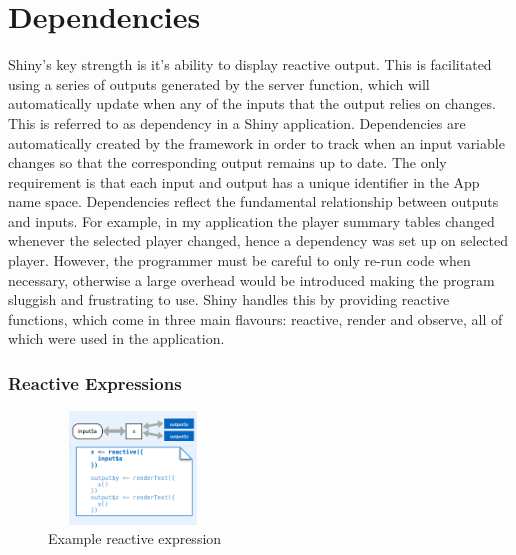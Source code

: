 \section{Dependencies}
Shiny's key strength is it's ability to display reactive output. This is facilitated using a series of outputs generated by the server function, which will automatically update when any of the inputs that the output relies on changes. This is referred to as dependency in a Shiny application. Dependencies are automatically created by the framework in order to track when an input variable changes so that the corresponding output remains up to date. The only requirement is that each input and output has a unique identifier in the App name space. Dependencies reflect the fundamental relationship between outputs and inputs. For example, in my application the player summary tables changed whenever the selected player changed, hence a dependency was set up on selected player. However, the programmer must be careful to only re-run code when necessary, otherwise a large overhead would be introduced making the program sluggish and frustrating to use. Shiny handles this by providing reactive functions, which come in three main flavours: reactive, render and observe, all of which were used in the application. 
\subsubsection{Reactive Expressions}
\begin{figure}
	\vspace{-2.5em}
	\caption{Example reactive expression \cite{shinyCheatSheet}\label{wrap-fig:1}}
	\includegraphics[height=3cm, width=4.5cm]{Images/ReactiveExpressionExample.png}
\end{figure}

